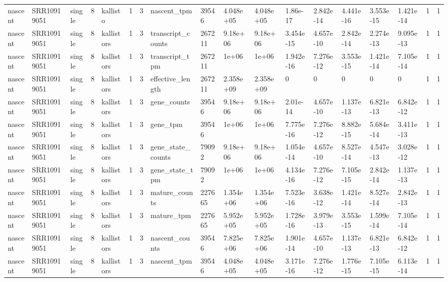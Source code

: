\begin{tabular}{llllllllllllllllll}
nascent & SRR10919051 & single & 8 & kallisto & 1 & 3 & nascent\_tpm & 39546 & 4.048e+05 & 4.048e+05 & 1.86e-17 & 2.842e-14 & 4.441e-16 & 3.553e-15 & 1.421e-14 & 1 & 1 \\
nascent & SRR10919051 & single & 8 & kallistors & 1 & 3 & transcript\_counts & 267211 & 9.18e+06 & 9.18e+06 & 3.454e-15 & 4.657e-10 & 2.842e-14 & 2.274e-13 & 9.095e-13 & 1 & 1 \\
nascent & SRR10919051 & single & 8 & kallistors & 1 & 3 & transcript\_tpm & 267211 & 1e+06 & 1e+06 & 1.942e-16 & 7.276e-12 & 3.553e-15 & 1.421e-14 & 7.105e-14 & 1 & 1 \\
nascent & SRR10919051 & single & 8 & kallistors & 1 & 3 & effective\_length & 267211 & 2.358e+09 & 2.358e+09 & 0 & 0 & 0 & 0 & 0 & 1 & 1 \\
nascent & SRR10919051 & single & 8 & kallistors & 1 & 3 & gene\_counts & 39546 & 9.18e+06 & 9.18e+06 & 2.01e-14 & 4.657e-10 & 1.137e-13 & 6.821e-13 & 6.842e-12 & 1 & 1 \\
nascent & SRR10919051 & single & 8 & kallistors & 1 & 3 & gene\_tpm & 39546 & 1e+06 & 1e+06 & 7.775e-16 & 7.276e-12 & 8.882e-15 & 5.684e-14 & 3.411e-13 & 1 & 1 \\
nascent & SRR10919051 & single & 8 & kallistors & 1 & 3 & gene\_state\_counts & 79092 & 9.18e+06 & 9.18e+06 & 1.054e-14 & 4.657e-10 & 8.527e-14 & 4.547e-13 & 3.028e-12 & 1 & 1 \\
nascent & SRR10919051 & single & 8 & kallistors & 1 & 3 & gene\_state\_tpm & 79092 & 1e+06 & 1e+06 & 4.134e-16 & 7.276e-12 & 7.105e-15 & 2.842e-14 & 1.137e-13 & 1 & 1 \\
nascent & SRR10919051 & single & 8 & kallistors & 1 & 3 & mature\_counts & 227665 & 1.354e+06 & 1.354e+06 & 7.523e-16 & 3.638e-12 & 1.421e-14 & 8.527e-14 & 2.842e-13 & 1 & 1 \\
nascent & SRR10919051 & single & 8 & kallistors & 1 & 3 & mature\_tpm & 227665 & 5.952e+05 & 5.952e+05 & 1.728e-16 & 3.979e-13 & 3.553e-15 & 1.599e-14 & 7.105e-14 & 1 & 1 \\
nascent & SRR10919051 & single & 8 & kallistors & 1 & 3 & nascent\_counts & 39546 & 7.825e+06 & 7.825e+06 & 1.901e-14 & 4.657e-10 & 1.137e-13 & 6.821e-13 & 6.842e-12 & 1 & 1 \\
nascent & SRR10919051 & single & 8 & kallistors & 1 & 3 & nascent\_tpm & 39546 & 4.048e+05 & 4.048e+05 & 3.171e-16 & 7.276e-12 & 1.776e-15 & 7.105e-15 & 6.113e-14 & 1 & 1 \\
\bottomrule
\end{tabular}
